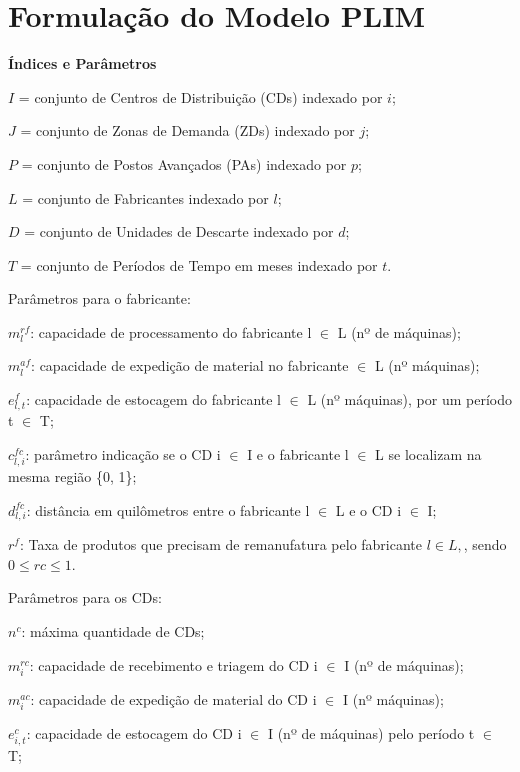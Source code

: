 \section[Formulação do Modelo PLIM]{Formulação do Modelo PLIM}\label{modeloproposto}
\label{Modelagem Matemática}

\noindent \textbf{Índices e Parâmetros}



$I$ = conjunto de Centros de Distribuição (CDs) indexado por $i$;

$J$ = conjunto de Zonas de Demanda (ZDs) indexado por $j$;

$P$ = conjunto de Postos Avançados (PAs) indexado por $p$;

$L$ = conjunto de Fabricantes indexado por $l$;

$D$ = conjunto de Unidades de Descarte indexado por $d$;

$T$ = conjunto de Períodos de Tempo em meses indexado por $t$.

Parâmetros para o fabricante:

$m^{rf}_{l}$: capacidade de processamento do fabricante l $\in$ L (nº de máquinas);

$m^{af}_{l}$: capacidade de expedição de material no fabricante $\in$ L (nº máquinas);

$e^{f}_{l,t}$: capacidade de estocagem do fabricante l $\in$ L (nº máquinas), por um período t $\in$ T;

$c^{fc}_{l,i}$: parâmetro indicação se o CD i $\in$ I e o fabricante l $\in$ L se localizam na mesma região \{0, 1\};

$d^{fc}_{l,i}$: distância em quilômetros entre o fabricante l $\in$ L e o CD i $\in$ I;

$r^{f}$: Taxa de produtos que precisam de remanufatura pelo fabricante \( l \in L, \), sendo \( 0 \leq rc \leq 1 \).

Parâmetros para os CDs:

$n^{c}$: máxima quantidade de CDs;

$m^{rc}_{i}$: capacidade de recebimento e triagem do CD i $\in$ I (nº de máquinas);

$m^{ac}_{i}$: capacidade de expedição de material do CD i $\in$ I (nº máquinas);

$e^{c}_{i,t}$: capacidade de estocagem do CD i $\in$ I (nº de máquinas) pelo período t $\in$ T;

